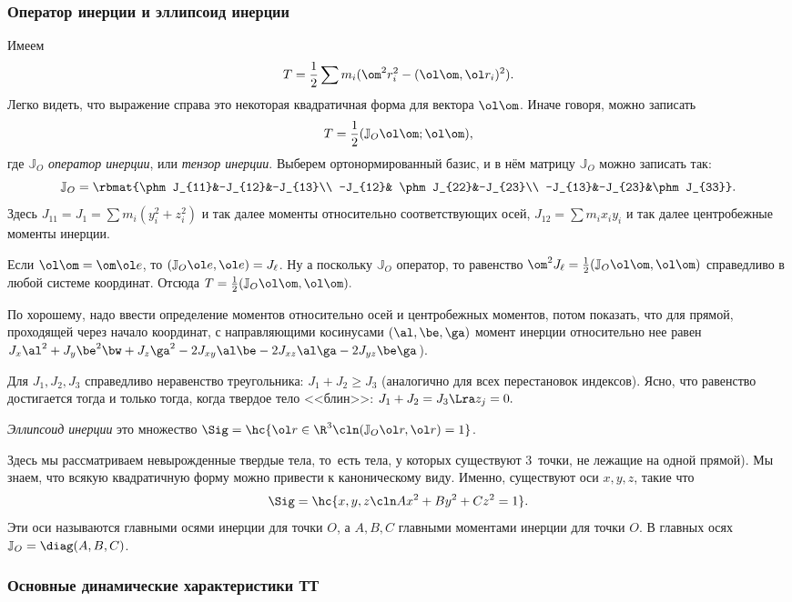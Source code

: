 \documentclass[a4paper,12pt]{article}
\def\w{\ol\om}
\def\r{\ol r}
\def\e{\ol e}
\def\JO{{\mathbb{J}_O}}
\begin{document}
\subsubsection{Оператор инерции и эллипсоид инерции}
Имеем
$$T=\frac12\sum m_i(\om^2r_i^2-(\w,\r_i)^2).$$
Легко видеть, что выражение справа это некоторая квадратичная форма
для вектора $\w$. Иначе говоря, можно записать
$$T=\frac12(\JO\w;\w),$$
где $\JO$ \emph{оператор инерции}, или \emph{тензор инерции}.
Выберем ортонормированный базис, и в нём матрицу $\JO$ можно записать так:
$$
\JO=
\rbmat{\phm J_{11}&-J_{12}&-J_{13}\\
-J_{12}& \phm J_{22}&-J_{23}\\
-J_{13}&-J_{23}&\phm J_{33}}.
$$
Здесь $J_{11}=J_1=\sum m_i(y_i^2+z_i^2)$ и так далее моменты относительно
соответствующих осей,
$J_{12}=\sum m_ix_iy_i$ и так далее центробежные моменты инерции.

Если $\w=\om \e$, то
$(\JO \e, \e)=J_\ell$. Ну а поскольку $\JO$ оператор, то  равенство
$\om^2J_\ell=\frac12(\JO\w,\w)$ справедливо в любой системе координат.
Отсюда $T=\frac12(\JO\w,\w).$

\begin{note} По хорошему, надо ввести определение
моментов относительно осей и центробежных моментов, потом показать,
что для прямой, проходящей через начало координат, с направляющими
косинусами $(\al,\be,\ga)$ момент инерции относительно нее равен
$J_x\al^2+J_y\be^2\bw+J_z\ga^2-2J_{xy}\al\be-2J_{xz}\al\ga-2J_{yz}\be\ga$).
\end{note}

 Для $J_1, J_2, J_3$ справедливо
неравенство треугольника: $J_1+J_2\ge J_3$ (аналогично для всех перестановок индексов).
Ясно, что равенство достигается тогда и только тогда, когда твердое тело <<блин>>:
$J_1+J_2=J_3\Lra z_j=0.$

\begin{df}
\emph{Эллипсоид инерции} это множество $\Sig=\hc{\r\in\R^3\cln (\JO\r,\r)=1}$.
\end{df}

Здесь мы рассматриваем невырожденные твердые тела, то~есть тела, у которых
существуют 3~точки, не лежащие на одной прямой).
Мы знаем, что всякую квадратичную форму можно привести к каноническому виду.
Именно, существуют оси $x,y,z$, такие что
$$\Sig=\hc{x,y,z\cln Ax^2+By^2+Cz^2=1}.$$
Эти оси называются главными осями инерции для точки $O$, а  $A,B,C$ главными
моментами инерции для точки $O$. В главных осях $\JO=\diag(A,B,C)$.

\subsubsection{Основные динамические характеристики ТТ}
\end{document}
